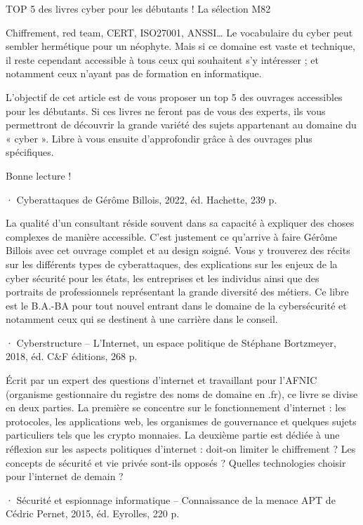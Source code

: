 

 TOP 5 des livres cyber pour les débutants !
La sélection M82

Chiffrement, red team, CERT, ISO27001, ANSSI… Le vocabulaire du cyber peut sembler hermétique pour un néophyte. Mais si ce domaine est vaste et technique, il reste cependant accessible à tous ceux qui souhaitent s’y intéresser ; et notamment ceux n’ayant pas de formation en informatique. 

L’objectif de cet article est de vous proposer un top 5 des ouvrages accessibles pour les débutants. Si ces livres ne feront pas de vous des experts, ils vous permettront de découvrir la grande variété des sujets appartenant au domaine du « cyber ». Libre à vous ensuite d’approfondir grâce à des ouvrages plus spécifiques.

Bonne lecture !

·       Cyberattaques de Gérôme Billois, 2022, éd. Hachette, 239 p.

La qualité d’un consultant réside souvent dans sa capacité à expliquer des choses complexes de manière accessible. C’est justement ce qu’arrive à faire Gérôme Billois avec cet ouvrage complet et au design soigné. Vous y trouverez des récits sur les différents types de cyberattaques, des explications sur les enjeux de la cyber sécurité pour les états, les entreprises et les individus ainsi que des portraits de professionnels représentant la grande diversité des métiers. Ce libre est le B.A.-BA pour tout nouvel entrant dans le domaine de la cybersécurité et notamment ceux qui se destinent à une carrière dans le conseil.



·       Cyberstructure – L’Internet, un espace politique de Stéphane Bortzmeyer, 2018, éd. C&F éditions, 268 p.

Écrit par un expert des questions d’internet et travaillant pour l’AFNIC (organisme gestionnaire du registre des noms de domaine en .fr), ce livre se divise en deux parties. La première se concentre sur le fonctionnement d’internet : les protocoles, les applications web, les organismes de gouvernance et quelques sujets particuliers tels que les crypto monnaies. La deuxième partie est dédiée à une réflexion sur les aspects politiques d’internet : doit-on limiter le chiffrement ? Les concepts de sécurité et vie privée sont-ils opposés ? Quelles technologies choisir pour l’internet de demain ?


·       Sécurité et espionnage informatique – Connaissance de la menace APT de Cédric Pernet, 2015, éd. Eyrolles, 220 p.

